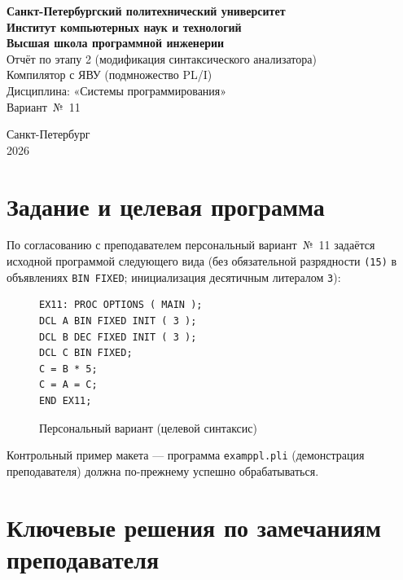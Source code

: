 \documentclass[a4paper,14pt]{extarticle}
\begin{document}
\thispagestyle{empty}
\begin{center}
  \textbf{Санкт-Петербургский политехнический университет}\\
  \textbf{Институт компьютерных наук и технологий}\\
  \textbf{Высшая школа программной инженерии}\\[2cm]

  {\large Отчёт по этапу 2 (модификация синтаксического анализатора)}\\[0.5cm]
  {\large Компилятор с ЯВУ (подмножество PL/I)}\\[1.5cm]

  Дисциплина: «Системы программирования»\\[0.5cm]
  Вариант~№~11\\[1.5cm]
\end{center}

\vfill
\begin{center}
  Санкт-Петербург\\
  2026
\end{center}

\newpage
\tableofcontents
\newpage

\section{Задание и целевая программа}

По согласованию с преподавателем персональный вариант~№~11 задаётся исходной
программой следующего вида (без обязательной разрядности \texttt{(15)} в
объявлениях \texttt{BIN FIXED}; инициализация десятичным литералом \texttt{3}):

\begin{figure}[H]
\centering
\begin{lstlisting}[style=PLIstyle]
EX11: PROC OPTIONS ( MAIN );
DCL A BIN FIXED INIT ( 3 );
DCL B DEC FIXED INIT ( 3 );
DCL C BIN FIXED;
C = B * 5;
C = A = C;
END EX11;
\end{lstlisting}
\caption{Персональный вариант (целевой синтаксис)}
\label{fig:variant}
\end{figure}

Контрольный пример макета --- программа \texttt{examppl.pli} (демонстрация
преподавателя) должна по-прежнему успешно обрабатываться.

\section{Ключевые решения по замечаниям преподавателя}
\end{document}
